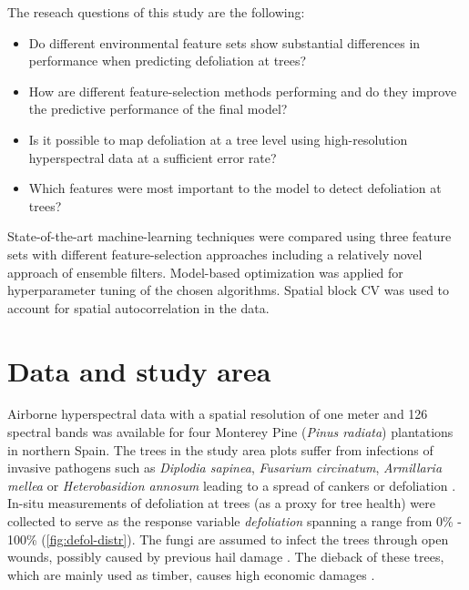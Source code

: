 \documentclass[review]{elsarticle}
\begin{document}
The reseach questions of this study are the following:

\begin{itemize}
	\item Do different environmental feature sets show substantial differences in performance when predicting defoliation at trees?
	\item How are different feature-selection methods performing and do they improve the predictive performance of the final model?
	\item Is it possible to map defoliation at a tree level using high-resolution hyperspectral data at a sufficient error rate?
	\item Which features were most important to the model to detect defoliation at trees?\end{itemize}

\noindent State-of-the-art machine-learning techniques were compared using three feature sets with different feature-selection approaches including a relatively novel approach of ensemble filters.
Model-based optimization was applied for hyperparameter tuning of the chosen algorithms.
Spatial block \ac{CV} was used to account for spatial autocorrelation in the data.

\section{Data and study area}
\noindent Airborne hyperspectral data with a spatial resolution of one meter and 126 spectral bands was available for four Monterey Pine (\textit{Pinus radiata}) plantations in northern Spain.
The trees in the study area plots suffer from infections of invasive pathogens such as \textit{Diplodia sapinea}, \textit{Fusarium circinatum}, \textit{Armillaria mellea} or \textit{Heterobasidion annosum} leading to a spread of cankers or defoliation \citep{mesanza2016, iturritxa2017}.
In-situ measurements of defoliation at trees (as a proxy for tree health) were collected to serve as the response variable \textit{defoliation} spanning a range from 0\% - 100\% (\autoref{fig:defol-distr}).
The fungi are assumed to infect the trees through open wounds, possibly caused by previous hail damage \citep{iturritxa2014}.
The dieback of these trees, which are mainly used as timber, causes high economic damages \citep{ganley2009}.
\end{document}
